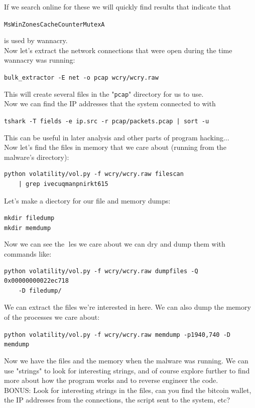 \documentclass{article}
\begin{document}
\noindent If we search online for these we will quickly find results that indicate that 
\begin{center}
    \lstinline{MsWinZonesCacheCounterMutexA}
\end{center}
\noindent is used by wannacry.\\

\noindent Now let's extract the network connections that were open during the time
wannacry was running:
\begin{center}
    \lstinline{bulk_extractor -E net -o pcap wcry/wcry.raw}
\end{center}
\noindent This will create several files in the "\lstinline{pcap}" directory for us to use.\\

\noindent Now we can find the IP addresses that the system connected to with
\begin{center}
    \lstinline{tshark -T fields -e ip.src -r pcap/packets.pcap | sort -u}
\end{center}
\noindent This can be useful in later analysis and other parts of program hacking...\\

\noindent Now let's find the files in memory that we care about (running from the
malware's directory):
\begin{lstlisting}
python volatility/vol.py -f wcry/wcry.raw filescan
    | grep ivecuqmanpnirkt615
\end{lstlisting}
\noindent Let's make a diectory for our file and memory dumps:
\begin{center}
    \lstinline{mkdir filedump}\\
    \lstinline{mkdir memdump}
\end{center}
\noindent Now we can see the les we care about we can dry and dump them with
commands like:
\begin{lstlisting}
python volatility/vol.py -f wcry/wcry.raw dumpfiles -Q 0x00000000022ec718
    -D filedump/
\end{lstlisting}
\noindent We can extract the files we're interested in here.
We can also dump the memory of the processes we care about:
\begin{center}
    \lstinline{python volatility/vol.py -f wcry/wcry.raw memdump -p1940,740 -D memdump}
\end{center}
\noindent Now we have the files and the memory when the malware was running.
We can use "strings" to look for interesting strings, and of course explore
further to find more about how the program works and to reverse engineer
the code.\\

\noindent BONUS: Look for interesting strings in the files, can you find the bitcoin
wallet, the IP addresses from the connections, the script sent to the system,
etc?
% 
% 
\end{document}
